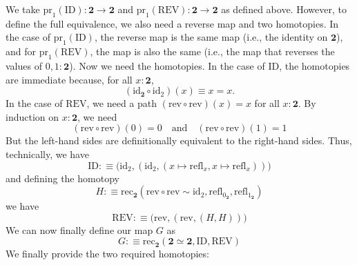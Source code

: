 \documentclass[14pt]{extarticle}
\newcommand{\0}{{\mathbf 0}}
\newcommand{\1}{{\mathbf 1}}
\newcommand{\2}{{\mathbf 2}}
\newcommand{\mt}{\mapsto}
\newcommand{\rec}{\mathrm{rec}}
\newcommand{\refl}{\mathrm{refl}}
\newcommand{\pr}{\mathrm{pr}}
\newcommand{\id}{\mathrm{id}}
\begin{document}
We take $\pr_1(\text{ID}) : \2 \to \2$ and $\pr_1(\text{REV}) : \2 \to \2$ as defined above. However, to define the full equivalence, we also need a reverse map and two homotopies. In the case of $\pr_1(\text{ID})$, the reverse map is the same map (i.e., the identity on $\2$), and for $\pr_1(\text{REV})$, the map is also the same (i.e., the map that reverses the values of $0,1 : \2$).
Now we need the homotopies. In the case of $\text{ID}$, the homotopies are immediate because, for all $x : \2$, \[(\id_\2 \circ \id_2)(x) \equiv x = x.\]
In the case of $\text{REV}$, we need a path $(\text{rev} \circ \text{rev})(x) = x$ for all $x : \2$. By induction on $x:\2$, we need 
\[(\text{rev} \circ \text{rev})(0) = 0 \quad \text{and} \quad (\text{rev} \circ \text{rev})(1) = 1\]
But the left-hand sides are definitionally equivalent to the right-hand sides.
Thus, technically, we have
\[\text{ID} :\equiv \Big(\id_2, (\id_2, (x \mt \refl_x, x \mt \refl_x))\Big)\] and defining the homotopy \[H :\equiv \rec_\2(\text{rev} \circ \text{rev} \sim \id_2, \refl_{0_\2}, \refl_{1_\2})\]
we have 
\[\text{REV} :\equiv \Big(\text{rev}, (\text{rev}, (H,H))\Big)\]
We can now finally define our map $G$ as
\[G :\equiv \rec_\2(\2 \simeq \2, \text{ID}, \text{REV})\]
We finally provide the two required homotopies:
\end{document}
